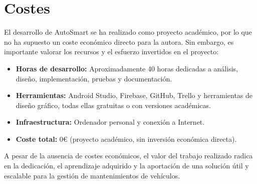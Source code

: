 \chapter{Costes}

El desarrollo de AutoSmart se ha realizado como proyecto académico, por lo que no ha supuesto un coste económico directo para la autora. Sin embargo, es importante valorar los recursos y el esfuerzo invertidos en el proyecto:

\begin{itemize}
    \item \textbf{Horas de desarrollo:} Aproximadamente 40 horas dedicadas a análisis, diseño, implementación, pruebas y documentación.
    \item \textbf{Herramientas:} Android Studio, Firebase, GitHub, Trello y herramientas de diseño gráfico, todas ellas gratuitas o con versiones académicas.
    \item \textbf{Infraestructura:} Ordenador personal y conexión a Internet.
    \item \textbf{Coste total:} 0€ (proyecto académico, sin inversión económica directa).
\end{itemize}

A pesar de la ausencia de costes económicos, el valor del trabajo realizado radica en la dedicación, el aprendizaje adquirido y la aportación de una solución útil y escalable para la gestión de mantenimientos de vehículos. 